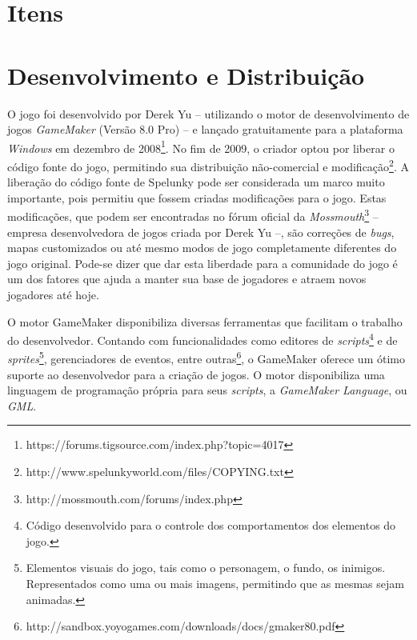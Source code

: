 \section{\label{section:spelunky-items}Itens}

\section{\label{section:spelunky-dev}Desenvolvimento e Distribuição}
O jogo foi desenvolvido por Derek Yu -- utilizando o motor de desenvolvimento de
jogos \textit{GameMaker} (Versão 8.0 Pro) -- e lançado gratuitamente para a
plataforma \textit{Windows} em dezembro de
2008\footnote{https://forums.tigsource.com/index.php?topic=4017}. No fim de
2009, o criador optou por liberar o código fonte do jogo, permitindo sua
distribuição não-comercial e
modificação\footnote{http://www.spelunkyworld.com/files/COPYING.txt}. A
liberação do código fonte de Spelunky pode ser considerada um marco muito
importante, pois permitiu que fossem criadas modificações para o jogo. Estas
modificações, que podem ser encontradas no fórum oficial da
\textit{Mossmouth}\footnote{http://mossmouth.com/forums/index.php} -- empresa
desenvolvedora de jogos criada por Derek Yu --, são correções de \textit{bugs},
mapas customizados ou até mesmo modos de jogo completamente diferentes do jogo
original. Pode-se dizer que dar esta liberdade para a comunidade do jogo é um
dos fatores que ajuda a manter sua base de jogadores e atraem novos jogadores
até hoje.

O motor GameMaker disponibiliza diversas ferramentas que facilitam o trabalho
do desenvolvedor. Contando com funcionalidades como editores de
\textit{scripts}\footnote{Código desenvolvido para o controle dos
comportamentos dos elementos do jogo.} e de \textit{sprites}\footnote{Elementos
visuais do jogo, tais como o personagem, o fundo, os inimigos. Representados
como uma ou mais imagens, permitindo que as mesmas sejam animadas.},
gerenciadores de eventos, entre
outras\footnote{http://sandbox.yoyogames.com/downloads/docs/gmaker80.pdf}, o
GameMaker oferece um ótimo suporte ao desenvolvedor para a criação de jogos. O
motor disponibiliza uma linguagem de programação própria para seus
\textit{scripts}, a \textit{GameMaker Language}, ou \textit{GML}.
